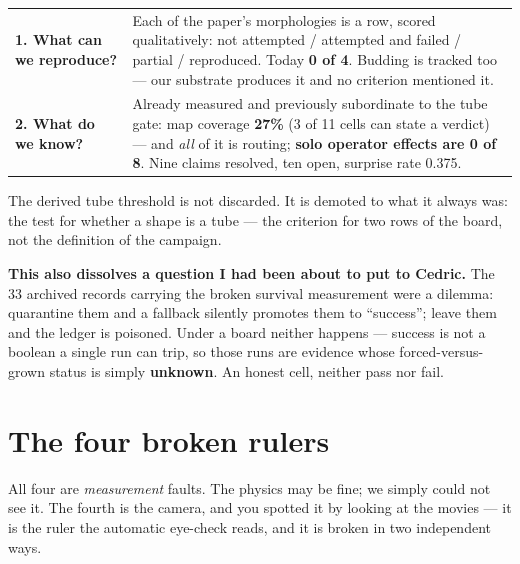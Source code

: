 \documentclass[11pt,a4paper]{article}
\begin{document}
\begin{center}\small
\begin{tabular}{@{}l p{10.4cm}@{}}
\toprule
\textbf{1. What can we reproduce?} & Each of the paper's morphologies is a row, scored
qualitatively: not attempted / attempted and failed / partial / reproduced. Today
\textbf{0 of 4}. Budding is tracked too --- our substrate produces it and no criterion mentioned
it.\\
\textbf{2. What do we know?} & Already measured and previously subordinate to the tube gate:
map coverage \textbf{27\%} (3 of 11 cells can state a verdict) --- and \emph{all} of it is
routing; \textbf{solo operator effects are 0 of 8}. Nine claims resolved, ten open, surprise
rate 0.375.\\
\bottomrule
\end{tabular}
\end{center}

The derived tube threshold is not discarded. It is demoted to what it always was: the test for
whether a shape is a tube --- the criterion for two rows of the board, not the definition of the
campaign.

\textbf{This also dissolves a question I had been about to put to Cedric.} The 33 archived records
carrying the broken survival measurement were a dilemma: quarantine them and a fallback silently
promotes them to ``success''; leave them and the ledger is poisoned. Under a board neither
happens --- success is not a boolean a single run can trip, so those runs are evidence whose
forced-versus-grown status is simply \textbf{unknown}. An honest cell, neither pass nor fail.

\section{The four broken rulers}\label{sec:rulers}

All four are \emph{measurement} faults. The physics may be fine; we simply could not see it.
The fourth is the camera, and you spotted it by looking at the movies --- it is the ruler the
automatic eye-check reads, and it is broken in two independent ways.
\end{document}
